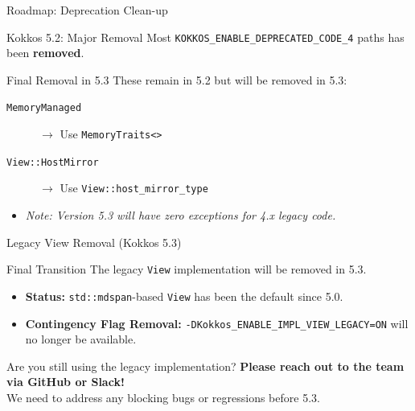 
\begin{frame}[fragile]{Roadmap: Deprecation Clean-up}

\begin{block}{Kokkos 5.2: Major Removal}
   Most \texttt{KOKKOS\_ENABLE\_DEPRECATED\_CODE\_4} paths has been \textbf{removed}.
\end{block}

\begin{alertblock}{Final Removal in 5.3}
These remain in 5.2 but will be removed in 5.3:
\begin{description}
    \item[\texttt{MemoryManaged}] $\rightarrow$ Use \texttt{MemoryTraits<>}
    \item[\texttt{View::HostMirror}] $\rightarrow$ Use \texttt{View::host\_mirror\_type}
\end{description}
\end{alertblock}

\begin{itemize}
    \item \textit{Note: Version 5.3 will have zero exceptions for 4.x legacy code.}
\end{itemize}

\end{frame}


\begin{frame}[fragile]{Legacy View Removal (Kokkos 5.3)}

\begin{alertblock}{Final Transition}
The legacy \texttt{View} implementation will be removed in 5.3.
\end{alertblock}

\begin{itemize}
    \item \textbf{Status:} \texttt{std::mdspan}-based \texttt{View} has been the default since 5.0.
    \item \textbf{Contingency Flag Removal:} \texttt{-DKokkos\_ENABLE\_IMPL\_VIEW\_LEGACY=ON} will no longer be available.
\end{itemize}

\vfill

\begin{block}{Are you still using the legacy implementation?}
\centering
\textbf{Please reach out to the team via GitHub or Slack!} \\
We need to address any blocking bugs or regressions before 5.3.
\end{block}

\end{frame}

